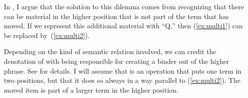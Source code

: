 \documentclass[output=paper]{langsci/langscibook}
\begin{document}
In \cite{Johnson2012}, I argue that the solution to this dilemma comes from
recognizing that there can be material in the higher position that is not part
of the term that has moved. If we represent this additional material with
``Q,'' then (\ref{ex:multi1}) can be replaced by~(\ref{ex:multi2}).

\ea\label{ex:multi2}
\z
%

Depending on the kind of semantic relation involved, we can credit the
denotation of  with being responsible for creating a binder out of the
higher phrase. See \cite{Johnson2012} for details. I will assume that 
is an operation that puts one term in two positions, but that it does so always
in a way parallel to (\ref{ex:multi2}). The moved item is part of a larger term
in the higher position.
\end{document}
